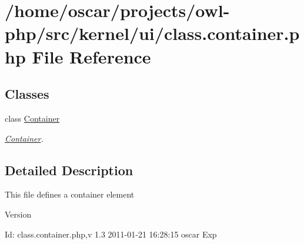 \section{/home/oscar/projects/owl-\/php/src/kernel/ui/class.container.php File Reference}
\label{kernel_2ui_2class_8container_8php}
\subsection*{Classes}
\begin{DoxyCompactItemize}
\item 
class \hyperlink{classContainer}{Container}
\begin{DoxyCompactList}\small\item\em \hyperlink{classContainer}{Container}. \item\end{DoxyCompactList}\end{DoxyCompactItemize}


\subsection{Detailed Description}
This file defines a container element \begin{DoxyVersion}{Version}

\end{DoxyVersion}
\begin{DoxyParagraph}{Id:}
class.container.php,v 1.3 2011-\/01-\/21 16:28:15 oscar Exp 
\end{DoxyParagraph}
